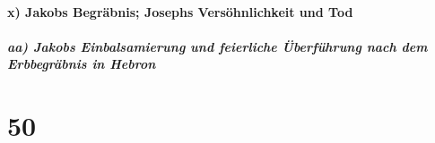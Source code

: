 \hypertarget{x-jakobs-begruxe4bnis-josephs-versuxf6hnlichkeit-und-tod}{%
\paragraph{x) Jakobs Begräbnis; Josephs Versöhnlichkeit und
Tod}\label{x-jakobs-begruxe4bnis-josephs-versuxf6hnlichkeit-und-tod}}

\hypertarget{aa-jakobs-einbalsamierung-und-feierliche-uxfcberfuxfchrung-nach-dem-erbbegruxe4bnis-in-hebron}{%
\subparagraph{aa) Jakobs Einbalsamierung und feierliche Überführung nach
dem Erbbegräbnis in
Hebron}\label{aa-jakobs-einbalsamierung-und-feierliche-uxfcberfuxfchrung-nach-dem-erbbegruxe4bnis-in-hebron}}

\hypertarget{section-49}{%
\section{50}\label{section-49}}

